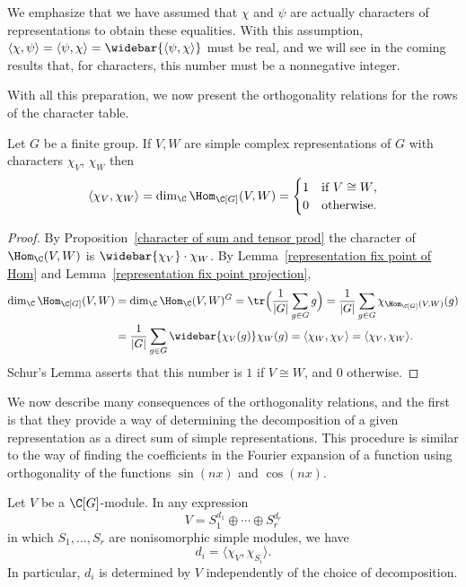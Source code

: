 We emphasize that we have assumed that $\chi$ and $\psi$ are actually characters of representations to obtain these equalities. With this assumption, $\langle\chi,\psi\rangle=\langle\psi,\chi\rangle=\widebar{\langle\psi,\chi\rangle}$ must be real, and we will see in the coming results that, for characters, this number must be a nonnegative integer.\par
With all this preparation, we now present the orthogonality relations for the rows of the character table.
\begin{theorem}
Let $G$ be a finite group. If $V,W$ are simple complex representations of $G$ with characters $\chi_V$, $\chi_W$ then
\[\langle\chi_V,\chi_W\rangle=\dim_\C\Hom_{\C[G]}(V,W)=\begin{cases}
1&\text{if $V\cong W$},\\
0&\text{otherwise}.
\end{cases}\]
\end{theorem}
\begin{proof}
By Proposition~\ref{character of sum and tensor prod} the character of $\Hom_{\C}(V,W)$ is $\widebar{\chi_{V}}\cdot\chi_W$. By Lemma~\ref{representation fix point of Hom} and Lemma~\ref{representation fix point projection},
\begin{align*}
\dim_\C\Hom_{\C[G]}(V,W)&=\dim_\C\Hom_{\C}(V,W)^G=\tr\Big(\frac{1}{|G|}\sum_{g\in G}g\Big)=\frac{1}{|G|}\sum_{g\in G}\chi_{\Hom_{\C[G]}(V,W)}(g)\\
&=\frac{1}{|G|}\sum_{g\in G}\widebar{\chi_V(g)}\chi_W(g)=\langle\chi_W,\chi_V\rangle=\langle\chi_V,\chi_W\rangle.
\end{align*}
Schur's Lemma asserts that this number is $1$ if $V\cong W$, and $0$ otherwise.
\end{proof}
We now describe many consequences of the orthogonality relations, and the first is that they provide a way of determining the decomposition of a given representation as a direct sum of simple representations. This procedure is similar to the way of finding the coefficients in the Fourier expansion of a function using orthogonality of the functions $\sin(nx)$ and $\cos(nx)$.
\begin{corollary}\label{representation multiplicity by char}
Let $V$ be a $\C[G]$-module. In any expression
\[V=S_1^{d_1}\oplus\cdots\oplus S_r^{d_r}\]
in which $S_1,\dots,S_r$ are nonisomorphic simple modules, we have
\[d_i=\langle\chi_V,\chi_{S_i}\rangle.\]
In particular, $d_i$ is determined by $V$ independently of the choice of decomposition.
\end{corollary}
